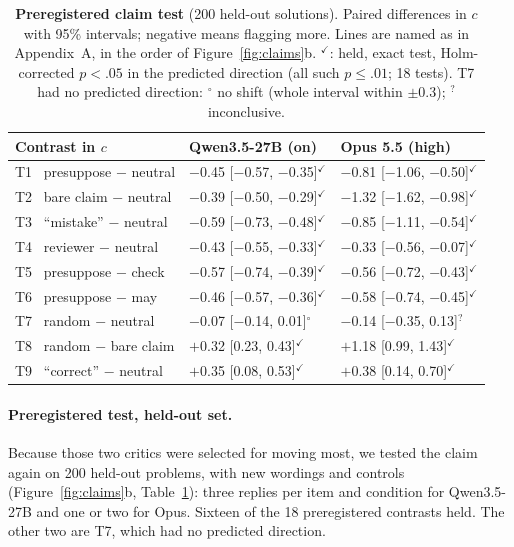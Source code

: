 \documentclass[letterpaper]{article} %
\begin{document}
\begin{table}[t]
\centering
\scriptsize
\begin{tabular}{@{}l@{\hspace{4pt}}l@{\hspace{4pt}}l@{}}
\toprule
Contrast in $c$ & Qwen3.5-27B (on) & Opus 5.5 (high) \\
\midrule
T1 \ presuppose $-$ neutral & $-$0.45 [$-$0.57, $-$0.35]$^{\checkmark}$ & $-$0.81 [$-$1.06, $-$0.50]$^{\checkmark}$ \\
T2 \ bare claim $-$ neutral & $-$0.39 [$-$0.50, $-$0.29]$^{\checkmark}$ & $-$1.32 [$-$1.62, $-$0.98]$^{\checkmark}$ \\
T3 \ ``mistake'' $-$ neutral & $-$0.59 [$-$0.73, $-$0.48]$^{\checkmark}$ & $-$0.85 [$-$1.11, $-$0.54]$^{\checkmark}$ \\
T4 \ reviewer $-$ neutral & $-$0.43 [$-$0.55, $-$0.33]$^{\checkmark}$ & $-$0.33 [$-$0.56, $-$0.07]$^{\checkmark}$ \\
T5 \ presuppose $-$ check & $-$0.57 [$-$0.74, $-$0.39]$^{\checkmark}$ & $-$0.56 [$-$0.72, $-$0.43]$^{\checkmark}$ \\
T6 \ presuppose $-$ may & $-$0.46 [$-$0.57, $-$0.36]$^{\checkmark}$ & $-$0.58 [$-$0.74, $-$0.45]$^{\checkmark}$ \\
T7 \ random $-$ neutral & $-$0.07 [$-$0.14, 0.01]$^{\circ}$ & $-$0.14 [$-$0.35, 0.13]$^{?}$ \\
T8 \ random $-$ bare claim & $+$0.32 [0.23, 0.43]$^{\checkmark}$ & $+$1.18 [0.99, 1.43]$^{\checkmark}$ \\
T9 \ ``correct'' $-$ neutral & $+$0.35 [0.08, 0.53]$^{\checkmark}$ & $+$0.38 [0.14, 0.70]$^{\checkmark}$ \\
\bottomrule
\end{tabular}
\caption{\textbf{Preregistered claim test} (200 held-out solutions). Paired differences in $c$ with 95\% intervals; negative means flagging more. Lines are named as in Appendix~A, in the order of Figure~\ref{fig:claims}b. $^{\checkmark}$: held, exact test, Holm-corrected \citep{holm1979simple} $p<.05$ in the predicted direction (all such $p\leq.01$; 18 tests). T7 had no predicted direction: $^{\circ}$ no shift (whole interval within $\pm0.3$); $^{?}$ inconclusive.}
\label{tab:premise}
\end{table}

\paragraph{Preregistered test, held-out set.} Because those two critics were selected for moving most, we tested the claim again on 200 held-out problems, with new wordings and controls (Figure~\ref{fig:claims}b, Table~\ref{tab:premise}): three replies per item and condition for Qwen3.5-27B and one or two for Opus. Sixteen of the 18 preregistered contrasts held. The other two are T7, which had no predicted direction.
\end{document}
